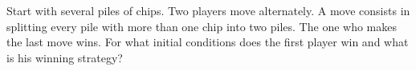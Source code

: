 Start with several piles of chips. Two players move alternately. A move consists in splitting every pile with more than one chip into two piles. The one who makes the last move wins. For what initial conditions does the first player win and what is his winning strategy?
